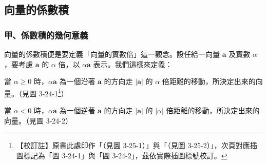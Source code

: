 \subsection{向量的係數積}
\label{sec:b3-3-4}

\subsubsection*{甲、係數積的幾何意義}

向量的係數積便是要定義「向量的實數倍」這一觀念。設任給一向量 $\mathbf{a}$ 及實數 $\alpha$，要考慮 $\mathbf{a}$ 的 $\alpha$ 倍，以 $\alpha\mathbf{a}$ 表示。我們這樣來定義：

\label{note:b3-ch3-p93-fig-ref}%
\begin{definition}
當 $\alpha \ge 0$ 時，$\alpha\mathbf{a}$ 為一個沿著 $\mathbf{a}$ 的方向走 $|\mathbf{a}|$ 的 $\alpha$ 倍距離的移動，所決定出來的向量。（見圖 3-24-1\footnote{【校訂註】原書此處印作「（見圖 3-25-1）」與「（見圖 3-25-2）」，次頁對應插圖標記為「圖 3-24-1」與「圖 3-24-2」，茲依實際插圖標號校訂。}）

當 $\alpha < 0$ 時，$\alpha\mathbf{a}$ 為一個逆著 $\mathbf{a}$ 的方向走 $|\mathbf{a}|$ 的 $|\alpha|$ 倍距離的移動，所決定出來的向量。（見圖 3-24-2）
\end{definition}

